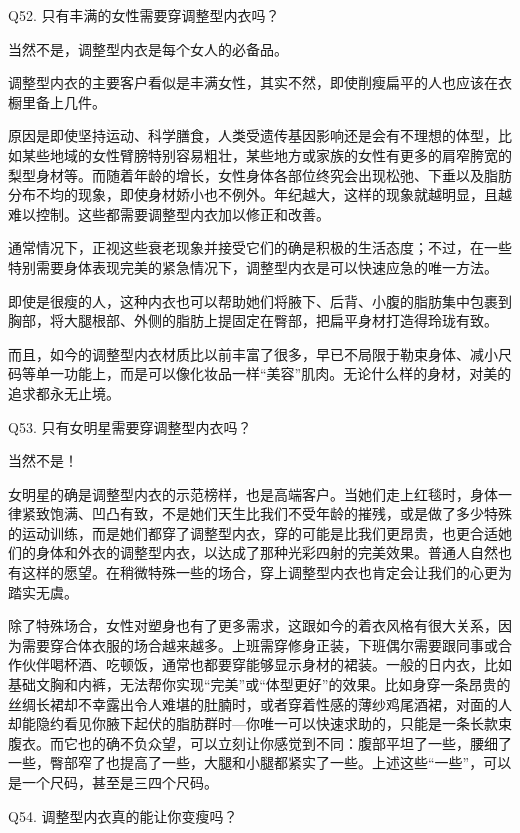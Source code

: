 \documentclass[12pt,UTF8]{ctexbook}
\begin{document}
Q52. 只有丰满的女性需要穿调整型内衣吗？


当然不是，调整型内衣是每个女人的必备品。

调整型内衣的主要客户看似是丰满女性，其实不然，即使削瘦扁平的人也应该在衣橱里备上几件。

原因是即使坚持运动、科学膳食，人类受遗传基因影响还是会有不理想的体型，比如某些地域的女性臂膀特别容易粗壮，某些地方或家族的女性有更多的肩窄胯宽的梨型身材等。而随着年龄的增长，女性身体各部位终究会出现松弛、下垂以及脂肪分布不均的现象，即使身材娇小也不例外。年纪越大，这样的现象就越明显，且越难以控制。这些都需要调整型内衣加以修正和改善。

通常情况下，正视这些衰老现象并接受它们的确是积极的生活态度；不过，在一些特别需要身体表现完美的紧急情况下，调整型内衣是可以快速应急的唯一方法。

即使是很瘦的人，这种内衣也可以帮助她们将腋下、后背、小腹的脂肪集中包裹到胸部，将大腿根部、外侧的脂肪上提固定在臀部，把扁平身材打造得玲珑有致。

而且，如今的调整型内衣材质比以前丰富了很多，早已不局限于勒束身体、减小尺码等单一功能上，而是可以像化妆品一样“美容”肌肉。无论什么样的身材，对美的追求都永无止境。





Q53. 只有女明星需要穿调整型内衣吗？


当然不是！

女明星的确是调整型内衣的示范榜样，也是高端客户。当她们走上红毯时，身体一律紧致饱满、凹凸有致，不是她们天生比我们不受年龄的摧残，或是做了多少特殊的运动训练，而是她们都穿了调整型内衣，穿的可能是比我们更昂贵，也更合适她们的身体和外衣的调整型内衣，以达成了那种光彩四射的完美效果。普通人自然也有这样的愿望。在稍微特殊一些的场合，穿上调整型内衣也肯定会让我们的心更为踏实无虞。

除了特殊场合，女性对塑身也有了更多需求，这跟如今的着衣风格有很大关系，因为需要穿合体衣服的场合越来越多。上班需穿修身正装，下班偶尔需要跟同事或合作伙伴喝杯酒、吃顿饭，通常也都要穿能够显示身材的裙装。一般的日内衣，比如基础文胸和内裤，无法帮你实现“完美”或“体型更好”的效果。比如身穿一条昂贵的丝绸长裙却不幸露出令人难堪的肚腩时，或者穿着性感的薄纱鸡尾酒裙，对面的人却能隐约看见你腋下起伏的脂肪群时—你唯一可以快速求助的，只能是一条长款束腹衣。而它也的确不负众望，可以立刻让你感觉到不同：腹部平坦了一些，腰细了一些，臀部窄了也提高了一些，大腿和小腿都紧实了一些。上述这些“一些”，可以是一个尺码，甚至是三四个尺码。





Q54. 调整型内衣真的能让你变瘦吗？
\end{document}
